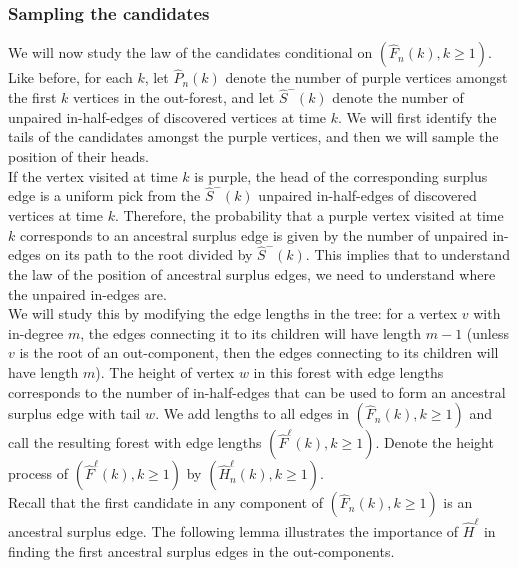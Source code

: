 \subsubsection{Sampling the candidates}\label{subsubsec.samplecandidates}
We will now study the law of the candidates conditional on $(\hat{F}_n(k),k\geq 1)$. Like before, for each $k$, let $\hat{P}_n(k)$ denote the number of purple vertices amongst the first $k$ vertices in the out-forest, and let $\hat{S}^-(k)$ denote the number of unpaired in-half-edges of discovered vertices at time $k$. We will first identify the tails of the candidates amongst the purple vertices, and then we will sample the position of their heads. \\
If the vertex visited at time $k$ is purple, the head of the corresponding surplus edge is a uniform pick from the $\hat{S}^-(k)$ unpaired in-half-edges of discovered vertices at time $k$. Therefore, the probability that a purple vertex visited at time $k$ corresponds to an ancestral surplus edge is given by the number of unpaired in-edges on its path to the root divided by $\hat{S}^-(k)$. This implies that to understand the law of the position of ancestral surplus edges, we need to understand where the unpaired in-edges are. \\
We will study this by modifying the edge lengths in the tree: for a vertex $v$ with in-degree $m$, the edges connecting it to its children will have length $m-1$ (unless $v$ is the root of an out-component, then the edges connecting to its children will have length $m$). The height of vertex $w$ in this forest with edge lengths corresponds to the number of in-half-edges that can be used to form an ancestral surplus edge with tail $w$. We add lengths to all edges in $(\hat{F}_n(k),k\geq 1)$ and call the resulting forest with edge lengths $(\hat{F}^\ell(k),k\geq 1)$. Denote the height process of $(\hat{F}^\ell(k),k\geq 1)$ by $(\hat{H}_n^\ell(k),k\geq 1)$. \\
Recall that the first candidate in any component of $(\hat{F}_n(k),k\geq 1)$ is an ancestral surplus edge. The following lemma illustrates the importance of $\hat{H}^\ell$ in finding the first ancestral surplus edges in the out-components.

